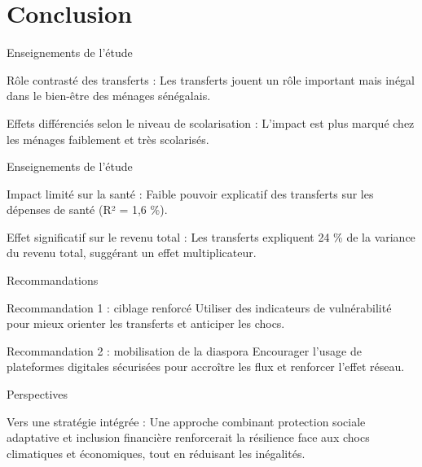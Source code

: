 \documentclass[
  11pt,
  ignorenonframetext,
]{beamer}
\begin{document}
\section{Conclusion}\label{conclusion}

\begin{frame}{Enseignements de l'étude}
\label{enseignements-de-luxe9tude}
\begin{block}{Rôle contrasté des transferts :}
\label{ruxf4le-contrastuxe9-des-transferts}
Les transferts jouent un rôle important mais inégal dans le bien-être
des ménages sénégalais.
\end{block}

\begin{block}{Effets différenciés selon le niveau de scolarisation :}
\label{effets-diffuxe9renciuxe9s-selon-le-niveau-de-scolarisation}
L'impact est plus marqué chez les ménages faiblement et très scolarisés.
\end{block}
\end{frame}

\begin{frame}{Enseignements de l'étude}
\label{enseignements-de-luxe9tude-1}
\begin{block}{Impact limité sur la santé :}
\label{impact-limituxe9-sur-la-santuxe9}
Faible pouvoir explicatif des transferts sur les dépenses de santé (R² =
1,6 \%).
\end{block}

\begin{block}{Effet significatif sur le revenu total :}
\label{effet-significatif-sur-le-revenu-total}
Les transferts expliquent 24 \% de la variance du revenu total,
suggérant un effet multiplicateur.
\end{block}
\end{frame}

\begin{frame}{Recommandations}
\label{recommandations}
\begin{block}{Recommandation 1 : ciblage renforcé}
\label{recommandation-1-ciblage-renforcuxe9}
Utiliser des indicateurs de vulnérabilité pour mieux orienter les
transferts et anticiper les chocs.
\end{block}

\begin{block}{Recommandation 2 : mobilisation de la diaspora}
\label{recommandation-2-mobilisation-de-la-diaspora}
Encourager l'usage de plateformes digitales sécurisées pour accroître
les flux et renforcer l'effet réseau.
\end{block}
\end{frame}

\begin{frame}{Perspectives}
\label{perspectives}
\begin{block}{Vers une stratégie intégrée :}
\label{vers-une-stratuxe9gie-intuxe9gruxe9e}
Une approche combinant protection sociale adaptative et inclusion
financière renforcerait la résilience face aux chocs climatiques et
économiques, tout en réduisant les inégalités.
\end{block}
\end{frame}
\end{document}
